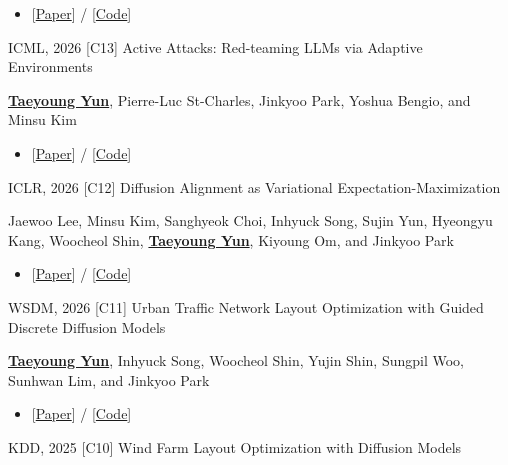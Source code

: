\documentclass[10pt]{developercv} %
\begin{document}
\begin{entrylist}
{        \begin{itemize}[noitemsep,topsep=2pt,parsep=2pt,partopsep=0pt, leftmargin=0pt]
            \item[]{[\href{}{Paper}] / [\href{https://github.com/urban-ai-institute/kra34-sumo-llm-qa-benchmark}{Code}]}
        \end{itemize}
        }
    \vspace{-3pt}
    \entry
        {ICML, 2026}
        {[C13] Active Attacks: Red-teaming LLMs via Adaptive Environments}
        {}
        {\underline{\textbf{Taeyoung Yun}}, Pierre-Luc St-Charles, Jinkyoo Park, Yoshua Bengio, and Minsu Kim
        \begin{itemize}[noitemsep,topsep=2pt,parsep=2pt,partopsep=0pt, leftmargin=0pt]
            \item[]{[\href{https://www.arxiv.org/abs/2509.21947}{Paper}] / [\href{https://github.com/dbsxodud-11/active_attacks}{Code}]}
        \end{itemize}
        }
    \vspace{-3pt}
    \entry
        {ICLR, 2026}
        {[C12] Diffusion Alignment as Variational Expectation-Maximization}
        {}
        {Jaewoo Lee, Minsu Kim, Sanghyeok Choi, Inhyuck Song, Sujin Yun, Hyeongyu Kang, Woocheol Shin, \underline{\textbf{Taeyoung Yun}}, Kiyoung Om, and Jinkyoo Park
        \begin{itemize}[noitemsep,topsep=2pt,parsep=2pt,partopsep=0pt, leftmargin=0pt]
            \item[]{[\href{https://arxiv.org/abs/2510.00502}{Paper}] / [\href{https://github.com/Jaewoopudding/dav}{Code}]}
        \end{itemize}
        }
    \vspace{-3pt}
    \entry
        {WSDM, 2026}
        {[C11] Urban Traffic Network Layout Optimization with Guided Discrete Diffusion Models}
        {}
        {\underline{\textbf{Taeyoung Yun}}, Inhyuck Song, Woocheol Shin, Yujin Shin, Sungpil Woo, Sunhwan Lim, and Jinkyoo Park
        \begin{itemize}[noitemsep,topsep=2pt,parsep=2pt,partopsep=0pt, leftmargin=0pt]
            \item[]{[\href{https://dl.acm.org/doi/abs/10.1145/3773966.3777950}{Paper}] / [\href{https://github.com/dbsxodud-11/traffic_layout}{Code}]}
        \end{itemize} 
        }
    \vspace{-3pt}
    \entry
        {KDD, 2025}
        {[C10] Wind Farm Layout Optimization with Diffusion Models}

\end{entrylist}
\end{document}
